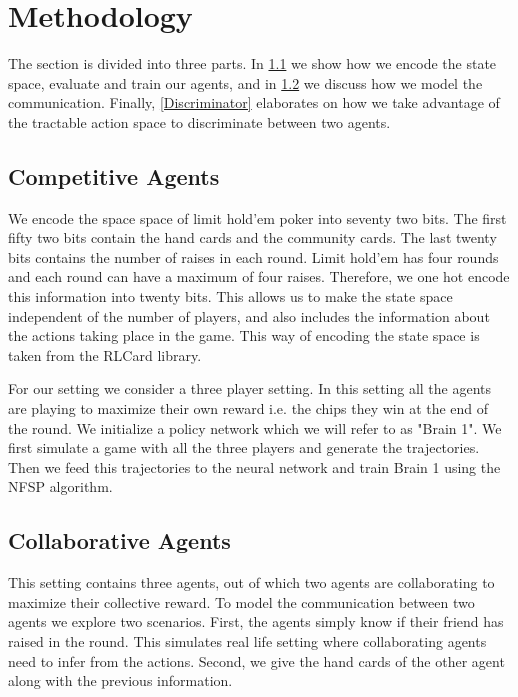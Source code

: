 \documentclass{article}
\begin{document}
\section{Methodology}

The section is divided into three parts. In \ref{Competitive Agent} we show how we encode the state space, evaluate and train our agents, and in \ref{Collaborative Agent} we discuss how we model the communication. Finally, \ref{Discriminator} elaborates on how we take advantage of the tractable action space to discriminate between two agents. 

\subsection{Competitive Agents} 
\label{Competitive Agent}%
We encode the space space of limit hold'em poker into seventy two bits. The first fifty two bits contain the hand cards and the community cards. The last twenty bits contains the number of raises in each round. Limit hold'em has four rounds and each round can have a maximum of four raises. Therefore, we one hot encode this information into twenty bits. This allows us to make the state space independent of the number of players, and also includes the information about the actions taking place in the game. This way of encoding the state space is taken from the RLCard \cite{rlcard} library.

For our setting we consider a three player setting. In this setting all the agents are playing to maximize their own reward i.e. the chips they win at the end of the round. We initialize a policy network which we will refer to as "Brain 1". We first simulate a game with all the three players and generate the trajectories. Then we feed this trajectories to the neural network and train Brain 1 using the NFSP \cite{nsfp:2016} algorithm.

\subsection{Collaborative Agents} 
\label{Collaborative Agent}%

This setting contains three agents, out of which two agents are collaborating to maximize their collective reward. To model the communication between two agents we explore two scenarios. First, the agents simply know if their friend has raised in the round. This simulates real life setting where collaborating agents need to infer from the actions. Second, we give the hand cards of the other agent along with the previous information. 
\end{document}
